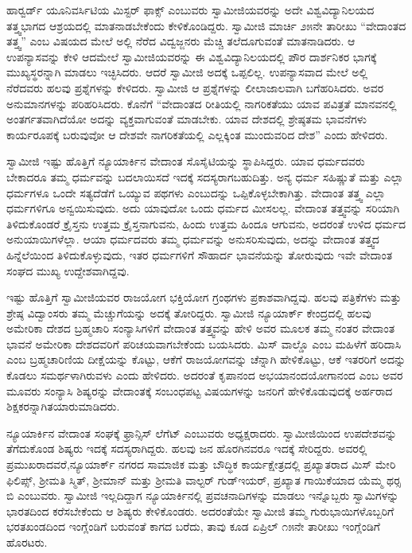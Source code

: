  ಹಾರ್‍ವರ್ಡ್ ಯೂನಿವರ್ಸಿಟಿಯ ಮಿಸ್ಟರ್ ಫಾಕ್ಸ್ ಎಂಬುವರು ಸ್ವಾಮೀಜಿಯವರನ್ನು ಅದೇ ವಿಶ್ವವಿದ್ಯಾನಿಲಯದ ತತ್ತ್ವಭಾಗದ ಆಶ್ರಯದಲ್ಲಿ ಮಾತನಾಡಬೇಕೆಂದು ಕೇಳಿಕೊಂಡಿದ್ದರು. ಸ್ವಾಮೀಜಿ ಮಾರ್ಚಿ ೨೫ನೇ ತಾರೀಖು “ವೇದಾಂತದ ತತ್ತ್ವ” ಎಂಬ ವಿಷಯದ ಮೇಲೆ ಅಲ್ಲಿ ನೆರೆದ ವಿದ್ವಜ್ಜನರು ಮೆಚ್ಚಿ ತಲೆದೂಗುವಂತೆ ಮಾತನಾಡಿದರು. ಆ ಉಪನ್ಯಾಸವನ್ನು ಕೇಳಿ ಆದಮೇಲೆ ಸ್ವಾಮೀಜಿಯವರನ್ನು ಈ ವಿಶ್ವವಿದ್ಯಾನಿಲಯದಲ್ಲಿ ಪೌರ ದಾರ್ಶನಿಕರ ಭಾಗಕ್ಕೆ ಮುಖ್ಯಸ್ಥರನ್ನಾಗಿ ಮಾಡಲು ಇಚ್ಛಿಸಿದರು. ಆದರೆ ಸ್ವಾಮೀಜಿ ಅದಕ್ಕೆ ಒಪ್ಪಲಿಲ್ಲ. ಉಪನ್ಯಾಸವಾದ ಮೇಲೆ ಅಲ್ಲಿ ನೆರೆದವರು ಹಲವು ಪ್ರಶ್ನೆಗಳನ್ನು ಕೇಳಿದರು. ಸ್ವಾಮೀಜಿ ಆ ಪ್ರಶ್ನೆಗಳನ್ನು ಲೀಲಾಜಾಲವಾಗಿ ಬಗೆಹರಿಸಿದರು. ಅವರ ಅನುಮಾನಗಳನ್ನು ಪರಿಹರಿಸಿದರು. ಕೊನೆಗೆ “ವೇದಾಂತದ ರೀತಿಯಲ್ಲಿ ನಾಗರಿಕತೆಯು ಯಾವ ಪವಿತ್ರತೆ ಮಾನವನಲ್ಲಿ ಅಂತರ್ಗತವಾಗಿದೆಯೋ ಅದನ್ನು ವ್ಯಕ್ತವಾಗುವಂತೆ ಮಾಡಬೇಕು. ಯಾವ ದೇಶದಲ್ಲಿ ಶ್ರೇಷ್ಠತಮ ಭಾವನೆಗಳು ಕಾರ್ಯರೂಪಕ್ಕೆ ಬರುವುವೋ ಆ ದೇಶವೇ ನಾಗರಿಕತೆಯಲ್ಲಿ ಎಲ್ಲಕ್ಕಿಂತ ಮುಂದುವರಿದ ದೇಶ” ಎಂದು ಹೇಳಿದರು. 

 ಸ್ವಾಮೀಜಿ ಇಷ್ಟು ಹೊತ್ತಿಗೆ ನ್ಯೂಯಾರ್ಕಿನ ವೇದಾಂತ ಸೊಸೈಟಿಯನ್ನು ಸ್ಥಾಪಿಸಿದ್ದರು. ಯಾವ ಧರ್ಮದವರು ಬೇಕಾದರೂ ತಮ್ಮ ಧರ್ಮವನ್ನು ಬದಲಾಯಿಸದೆ ಇದಕ್ಕೆ \break ಸದಸ್ಯರಾಗಬಹುದಿತ್ತು. ಅನ್ಯ ಧರ್ಮ ಸಹಿಷ್ಣುತೆ ಮತ್ತು ಎಲ್ಲಾ ಧರ್ಮಗಳೂ ಒಂದೇ ಸತ್ಯದೆಡೆಗೆ ಒಯ್ಯುವ ಪಥಗಳು ಎಂಬುದನ್ನು ಒಪ್ಪಿಕೊಳ್ಳಬೇಕಾಗಿತ್ತು. ವೇದಾಂತ ತತ್ತ್ವ ಎಲ್ಲಾ ಧರ್ಮಗಳಿಗೂ ಅನ್ವಯಿಸುವುದು. ಅದು ಯಾವುದೋ ಒಂದು ಧರ್ಮದ ಮೀಸಲಲ್ಲ. ವೇದಾಂತ ತತ್ತ್ವವನ್ನು ಸರಿಯಾಗಿ ತಿಳಿದುಕೊಂಡರೆ ಕ್ರೈಸ್ತನು ಉತ್ತಮ ಕ್ರೈಸ್ತನಾಗುವನು, ಹಿಂದು ಉತ್ತಮ ಹಿಂದೂ ಆಗುವನು, ಅದರಂತೆ ಉಳಿದ ಧರ್ಮದ ಅನುಯಾಯಿಗಳೆಲ್ಲಾ. ಆಯಾ ಧರ್ಮದವರು ತಮ್ಮ ಧರ್ಮವನ್ನು ಅನುಸರಿಸುವುದು, ಅದನ್ನು ವೇದಾಂತ ತತ್ತ್ವದ ಹಿನ್ನೆಲೆಯಿಂದ ತಿಳಿದುಕೊಳ್ಳುವುದು, ಇತರ ಧರ್ಮಗಳಿಗೆ ಸೌಹಾರ್ದ ಭಾವನೆಯನ್ನು ತೋರುವುದು ಇವೇ ವೇದಾಂತ ಸಂಘದ ಮುಖ್ಯ ಉದ್ದೇಶವಾಗಿದ್ದವು. 

 ಇಷ್ಟು ಹೊತ್ತಿಗೆ ಸ್ವಾಮೀಜಿಯವರ ರಾಜಯೋಗ ಭಕ್ತಿಯೋಗ ಗ್ರಂಥಗಳು ಪ್ರಕಾಶವಾಗಿದ್ದವು. ಹಲವು ಪತ್ರಿಕೆಗಳು ಮತ್ತು ಶ್ರೇಷ್ಠ ವಿದ್ವಾಂಸರು ತಮ್ಮ ಮೆಚ್ಚುಗೆಯನ್ನು ಅದಕ್ಕೆ ತೋರಿದ್ದರು. ಸ್ವಾಮೀಜಿ ನ್ಯೂಯಾರ್ಕ್ ಕೇಂದ್ರದಲ್ಲಿ ಹಲವು ಅಮೇರಿಕಾ ದೇಶದ ಬ್ರಹ್ಮಚಾರಿ ಸಂನ್ಯಾಸಿಗಳಿಗೆ ವೇದಾಂತ ತತ್ತ್ವವನ್ನು ಹೇಳಿ ಅವರ ಮೂಲಕ ತಮ್ಮ ನಂತರ ವೇದಾಂತ ಭಾವನೆ ಅಮೇರಿಕಾ ದೇಶದವರಿಗೆ ಪರಿಚಯವಾಗಬೇಕೆಂದು ಬಯಸಿದರು. ಮಿಸ್ ವಾಲ್ಡೊ ಎಂಬ ಮಹಿಳೆಗೆ ಹರಿದಾಸಿ ಎಂಬ ಬ್ರಹ್ಮಚಾರಿಣಿಯ ದೀಕ್ಷೆಯನ್ನು ಕೊಟ್ಟು, ಆಕೆಗೆ ರಾಜಯೋಗವನ್ನು ಚೆನ್ನಾಗಿ ಹೇಳಿಕೊಟ್ಟು, ಆಕೆ ಇತರರಿಗೆ ಅದನ್ನು ಕೊಡಲು ಸಮರ್ಥಳಾಗಿರುವಳು ಎಂದು ಹೇಳಿದರು. ಅದರಂತೆ ಕೃಪಾನಂದ ಅಭಯಾನಂದ\break ಯೋಗಾನಂದ ಎಂಬ ಅವರ ಮೂವರು ಸಂನ್ಯಾಸಿ ಶಿಷ್ಯರನ್ನು ವೇದಾಂತಕ್ಕೆ ಸಂಬಂಧಪಟ್ಟ ವಿಷಯಗಳನ್ನು ಜನರಿಗೆ ಹೇಳಿಕೊಡುವುದಕ್ಕೆ ಅರ್ಹರಾದ ಶಿಕ್ಷಕರನ್ನಾಗಿತಯಾರು\break ಮಾಡಿದರು. 

 ನ್ಯೂಯಾರ್ಕಿನ ವೇದಾಂತ ಸಂಘಕ್ಕೆ ಫ್ರಾನ್ಸಿಸ್ ಲೆಗೆಟ್ ಎಂಬುವರು ಅಧ್ಯಕ್ಷರಾದರು. ಸ್ವಾಮೀಜಿಯಿಂದ ಉಪದೇಶವನ್ನು ತೆಗೆದುಕೊಂಡ ಶಿಷ್ಯರು ಇದಕ್ಕೆ ಸದಸ್ಯರಾಗಿದ್ದರು. ಹಲವು ಜನ ಹೊರಗಿನವರೂ ಇದಕ್ಕೆ ಸೇರಿದ್ದರು. ಅವರಲ್ಲಿ ಪ್ರಮುಖರಾದವರೆ,\break ನ್ಯೂಯಾರ್ಕ್ ನಗರದ ಸಾಮಾಜಿಕ ಮತ್ತು ಬೌದ್ಧಿಕ ಕಾರ್ಯಕ್ಷೇತ್ರದಲ್ಲಿ ಪ್ರಖ್ಯಾತರಾದ ಮಿಸ್ ಮೇರಿ ಫಿಲಿಪ್ಸ್, ಶ‍್ರೀಮತಿ ಸ್ಮಿತ್, ಶ‍್ರೀಮಾನ್ ಮತ್ತು ಶ‍್ರೀಮತಿ ವಾಲ್ಟರ್ ಗುಡ್‍ಇಯರ್, ಪ್ರಖ್ಯಾತ ಗಾಯಿಕೆಯಾದ ಯೆಮ್ಮ ಥರ‍್ಸ ಬಿ ಎಂಬುವರು. ಸ್ವಾಮೀಜಿ ಇಲ್ಲದಿದ್ದಾಗ ನ್ಯೂಯಾರ್ಕಿನಲ್ಲಿ ಪ್ರವಚನಾದಿಗಳನ್ನು ಮಾಡಲು ಇನ್ನೊಬ್ಬರು ಸ್ವಾಮಿಗಳನ್ನು ಭಾರತದಿಂದ ಕರೆಸಬೇಕೆಂದು ಆ ಶಿಷ್ಯರು ಕೇಳಿಕೊಂಡರು. ಅದರಂತೆಯೇ ಸ್ವಾಮೀಜಿ ತಮ್ಮ ಗುರುಭಾಯಿಗಳೊಬ್ಬರಿಗೆ ಭರತಖಂಡದಿಂದ ಇಂಗ್ಲೆಂಡಿಗೆ ಬರುವಂತೆ ಕಾಗದ ಬರೆದು, ತಾವು ಕೂಡ ಏಪ್ರಿಲ್ ೧೫ನೇ ತಾರೀಖು ಇಂಗ್ಲೆಂಡಿಗೆ ಹೊರಟರು. 

